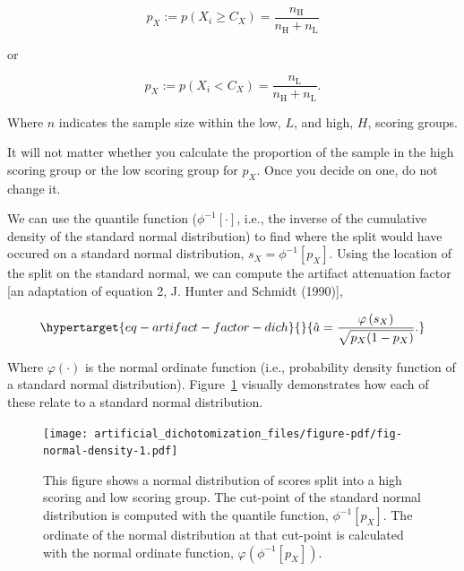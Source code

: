\documentclass[
  letterpaper,
  DIV=11,
  numbers=noendperiod]{scrreprt}
\begin{document}
\[
p_X  := p(X_i \geq C_X) = \frac{ n_{\text{H}} }{n_{\text{H}} + n_{\text{L}}}
\]

or

\[
p_X := p(X_i < C_X) = \frac{ n_{\text{L}} }{n_{\text{H}} + n_{\text{L}}}.
\]

Where \(n\) indicates the sample size within the low, \(L\), and high,
\(H\), scoring groups.

\begin{tcolorbox}[enhanced jigsaw, toptitle=1mm, titlerule=0mm, arc=.35mm, breakable, colframe=quarto-callout-tip-color-frame, title={Note}, opacitybacktitle=0.6, opacityback=0, colbacktitle=quarto-callout-tip-color!10!white, coltitle=black, bottomtitle=1mm, colback=white, bottomrule=.15mm, rightrule=.15mm, toprule=.15mm, leftrule=.75mm, left=2mm]

It will not matter whether you calculate the proportion of the sample in
the high scoring group or the low scoring group for \(p_X\). Once you
decide on one, do not change it.

\end{tcolorbox}

We can use the quantile function (\(\phi^{-1}[\cdot]\), i.e., the
inverse of the cumulative density of the standard normal distribution)
to find where the split would have occured on a standard normal
distribution, \(s_X=\phi^{-1}[p_X]\). Using the location of the split on
the standard normal, we can compute the artifact attenuation factor
{[}an adaptation of equation 2, J. Hunter and Schmidt (1990){]},

\begin{equation}\protect\hypertarget{eq-artifact-factor-dich}{}{
\hat{a} =\frac{\varphi\left(s_X\right)}{\sqrt{p_X(1-p_X)}}.
}\label{eq-artifact-factor-dich}\end{equation}

Where \(\varphi(\cdot)\) is the normal ordinate function (i.e.,
probability density function of a standard normal distribution).
Figure~\ref{fig-normal-density} visually demonstrates how each of these
relate to a standard normal distribution.

\begin{figure}[H]

{\centering \texttt{[image: artificial\_dichotomization\_files/figure-pdf/fig-normal-density-1.pdf]}

}

\caption{\label{fig-normal-density}This figure shows a normal
distribution of scores split into a high scoring and low scoring group.
The cut-point of the standard normal distribution is computed with the
quantile function, \(\phi^{-1}[p_X]\). The ordinate of the normal
distribution at that cut-point is calculated with the normal ordinate
function, \(\varphi\left(\phi^{-1}[p_X]\right)\).}

\end{figure}
\end{document}
